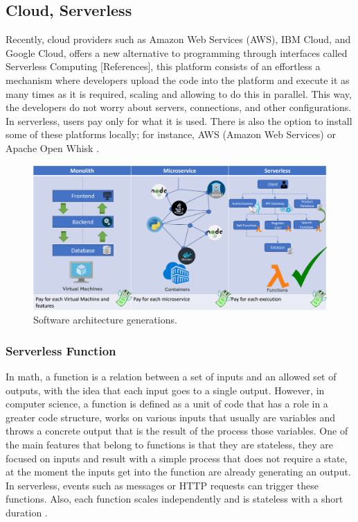 \documentclass[runningheads]{llncs}
\begin{document}
\subsection{Cloud, Serverless}


Recently, cloud providers such as Amazon Web Services (AWS), IBM Cloud, and
Google Cloud, offers a new alternative to programming through interfaces called
Serverless Computing [References], this platform consists of an effortless a
mechanism where developers upload the code into the platform and execute it as
many times as it is required, scaling and allowing to do this in parallel. This
way, the developers do not worry about servers, connections, and other
configurations. In serverless, users pay only for what it is used. There is also
the option to install some of these platforms locally; for instance, AWS (Amazon
Web Services) \cite{Baird2016} or Apache Open Whisk \cite{Guerv2018}. 


\begin{figure}[htp]
  \includegraphics[width=\textwidth]{img/architectures.png}
  \caption{Software architecture generations.} \label{fig1}
  \end{figure}

\subsubsection{Serverless Function} 
In math, a function is a relation between a set of inputs and an allowed set of
outputs, with the idea that each input goes to a single output. However, in
computer science, a function is defined as a unit of code that has a role in a
greater code structure, works on various inputs that usually are variables and
throws a concrete output that is the result of the process those variables. One
of the main features that belong to functions is that they are stateless, they
are focused on inputs and result with a simple process that does not require a
state, at the moment the inputs get into the function are already generating an
output. In serverless, events such as messages or HTTP requests can trigger
these functions. Also, each function scales independently and is stateless with
a short duration \cite{Baird2016,Cook2017}.
\end{document}
